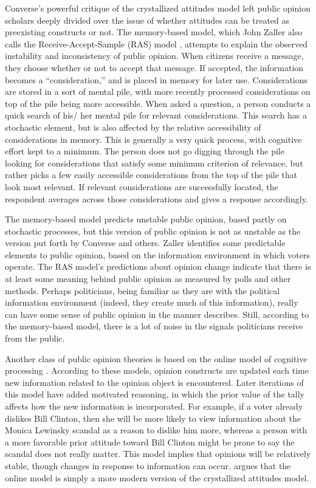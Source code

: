Converse's \citeyearpar{Converse1964} powerful critique of the crystallized attitudes model left public opinion scholars deeply divided over the issue of whether attitudes can be treated as preexisting constructs or not. The memory-based model, which John Zaller also calls the Receive-Accept-Sample (RAS) model \citep{Zaller1992a,Zaller1992b}, attempts to explain the observed instability and inconsistency of public opinion. When citizens receive a message, they choose whether or not to accept that message. If accepted, the information becomes a ``consideration,'' and is placed in memory for later use. Considerations are stored in a sort of mental pile, with more recently processed considerations on top of the pile being more accessible. When asked a question, a person conducts a quick search of his/ her mental pile for relevant considerations. This search has a stochastic element, but is also affected by the relative accessibility of considerations in memory. This is generally a very quick process, with cognitive effort kept to a minimum. The person does not go digging through the pile looking for considerations that satisfy some minimum criterion of relevance, but rather picks a few easily accessible considerations from the top of the pile that look most relevant. If relevant considerations are successfully located, the respondent averages across those considerations and gives a response accordingly.

The memory-based model predicts unstable public opinion, based partly on stochastic processes, but this version of public opinion is not as unstable as the version put forth by Converse and others. Zaller identifies some predictable elements to public opinion, based on the information environment in which voters operate. The RAS model's predictions about opinion change indicate that there is at least some meaning behind public opinion as measured by polls and other methods. Perhaps politicians, being familiar as they are with the political information environment (indeed, they create much of this information), really can have some sense of public opinion in the manner \citet{Kingdon1995} describes. Still, according to the memory-based model, there is a lot of noise in the signals politicians receive from the public.

Another class of public opinion theories is based on the online model of cognitive processing \citep{Hastie1986,Lodge1989,Taber2006}. According to these models, opinion constructs are updated each time new information related to the opinion object is encountered. Later iterations of this model have added motivated reasoning, in which the prior value of the tally affects how the new information is incorporated. For example, if a voter already dislikes Bill Clinton, then she will be more likely to view information about the Monica Lewinsky scandal as a reason to dislike him more, whereas a person with a more favorable prior attitude toward Bill Clinton might be prone to say the scandal does not really matter. This model implies that opinions will be relatively stable, though changes in response to information can occur. \citet{Zaller1992a} argues that the online model is simply a more modern version of the crystallized attitudes model.

